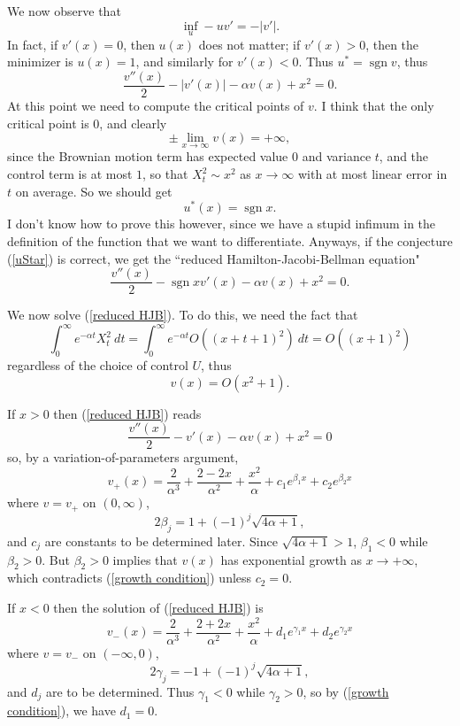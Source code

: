 \documentclass[10pt]{article}
\newcommand{\sgn}{\operatorname{sgn}}
\theoremstyle{definition}
\begin{document}
We now observe that
$$\inf_u -uv' = -|v'|.$$
In fact, if $v'(x) = 0$, then $u(x)$ does not matter; if $v'(x) > 0$, then the minimizer is $u(x) = 1$, and similarly for $v'(x) < 0$.
Thus $u^* = \sgn v$, thus
$$\frac{v''(x)}{2} - |v'(x)| - \alpha v(x) + x^2 = 0.$$
At this point we need to compute the critical points of $v$.
I think that the only critical point is $0$, and clearly
$$\pm \lim_{x \to \infty} v(x) = +\infty,$$
since the Brownian motion term has expected value $0$ and variance $t$, and the control term is at most $1$, so that $X_t^2 \sim x^2$ as $x \to \infty$ with at most linear error in $t$ on average.
So we should get
\begin{equation}
\label{uStar}
u^*(x) = \sgn x.
\end{equation}
I don't know how to prove this however, since we have a stupid infimum in the definition of the function that we want to differentiate. Anyways, if the conjecture (\ref{uStar}) is correct, we get the ``reduced Hamilton-Jacobi-Bellman equation"
\begin{equation}
\label{reduced HJB}
\frac{v''(x)}{2} - \sgn x v'(x) - \alpha v(x) + x^2 = 0.
\end{equation}

We now solve (\ref{reduced HJB}).
To do this, we need the fact that
$$\int_0^\infty e^{-\alpha t} X_t^2 ~dt = \int_0^\infty e^{-\alpha t} O((x + t + 1)^2) ~dt = O((x + 1)^2)$$
regardless of the choice of control $U$, thus
\begin{equation}
\label{growth condition}
v(x) = O(x^2 + 1).
\end{equation}

If $x > 0$ then (\ref{reduced HJB}) reads
$$\frac{v''(x)}{2} - v'(x) - \alpha v(x) + x^2 = 0$$
so, by a variation-of-parameters argument,
$$v_+(x) = \frac{2}{\alpha^3} + \frac{2 - 2x}{\alpha^2} + \frac{x^2}{\alpha} + c_1 e^{\beta_1x} + c_2 e^{\beta_2x}$$
where $v = v_+$ on $(0, \infty)$,
$$2\beta_j = 1 + (-1)^j \sqrt{4\alpha + 1},$$
and $c_j$ are constants to be determined later.
Since $\sqrt{4\alpha + 1} > 1$, $\beta_1 < 0$ while $\beta_2 > 0$.
But $\beta_2 > 0$ implies that $v(x)$ has exponential growth as $x \to +\infty$, which contradicts (\ref{growth condition}) unless $c_2 = 0$.

If $x < 0$ then the solution of (\ref{reduced HJB}) is
$$v_-(x) = \frac{2}{\alpha^3} + \frac{2 + 2x}{\alpha^2} + \frac{x^2}{\alpha} + d_1 e^{\gamma_1x} + d_2 e^{\gamma_2x}$$
where $v = v_-$ on $(-\infty, 0)$,
$$2\gamma_j = -1 + (-1)^j \sqrt{4\alpha + 1},$$
and $d_j$ are to be determined.
Thus $\gamma_1 < 0$ while $\gamma_2 > 0$, so by (\ref{growth condition}), we have $d_1 = 0$.
\end{document}
